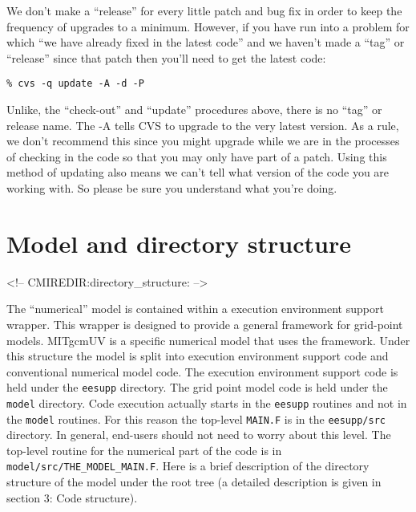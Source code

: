 We don't make a ``release'' for every little patch and bug fix in
order to keep the frequency of upgrades to a minimum. However, if you
have run into a problem for which ``we have already fixed in the
latest code'' and we haven't made a ``tag'' or ``release'' since that
patch then you'll need to get the latest code:
\begin{verbatim}
% cvs -q update -A -d -P
\end{verbatim}
Unlike, the ``check-out'' and ``update'' procedures above, there is no
``tag'' or release name. The -A tells CVS to upgrade to the
very latest version. As a rule, we don't recommend this since you
might upgrade while we are in the processes of checking in the code so
that you may only have part of a patch. Using this method of updating
also means we can't tell what version of the code you are working
with. So please be sure you understand what you're doing.

\section{Model and directory structure}
\begin{rawhtml}
<!-- CMIREDIR:directory_structure: -->
\end{rawhtml}

The ``numerical'' model is contained within a execution environment
support wrapper. This wrapper is designed to provide a general
framework for grid-point models. MITgcmUV is a specific numerical
model that uses the framework. Under this structure the model is split
into execution environment support code and conventional numerical
model code. The execution environment support code is held under the
\texttt{eesupp} directory. The grid point model code is held under the
\texttt{model} directory. Code execution actually starts in the
\texttt{eesupp} routines and not in the \texttt{model} routines. For
this reason the top-level \texttt{MAIN.F} is in the
\texttt{eesupp/src} directory. In general, end-users should not need
to worry about this level. The top-level routine for the numerical
part of the code is in \texttt{model/src/THE\_MODEL\_MAIN.F}. Here is
a brief description of the directory structure of the model under the
root tree (a detailed description is given in section 3: Code
structure).

